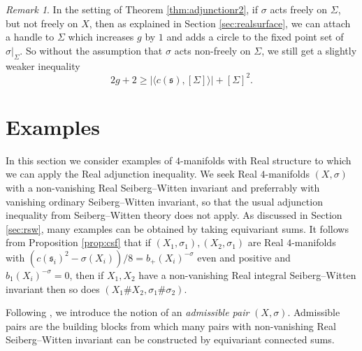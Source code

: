 \documentclass{amsart}
\theoremstyle{definition}
\theoremstyle{remark}
\newtheorem{remark}[theorem]{Remark}
\numberwithin{equation}{section}
\begin{document}
\begin{remark}
In the setting of Theorem \ref{thm:adjunctionr2}, if $\sigma$ acts freely on $\Sigma$, but not freely on $X$, then as explained in Section \ref{sec:realsurface}, we can attach a handle to $\Sigma$ which increases $g$ by $1$ and adds a circle to the fixed point set of $\sigma|_\Sigma$. So without the assumption that $\sigma$ acts non-freely on $\Sigma$, we still get a slightly weaker inequality
\[
2g+2 \ge | \langle c(\mathfrak{s}) , [\Sigma] \rangle | + [\Sigma]^2.
\]
\end{remark}




\section{Examples}\label{sec:ex}

In this section we consider examples of $4$-manifolds with Real structure to which we can apply the Real adjunction inequality. We seek Real $4$-manifolds $(X , \sigma)$ with a non-vanishing Real Seiberg--Witten invariant and preferrably with vanishing ordinary Seiberg--Witten invariant, so that the usual adjunction inequality from Seiberg--Witten theory does not apply. As discussed in Section \ref{sec:rsw}, many examples can be obtained by taking equivariant sums. It follows from Proposition \ref{prop:csf} that if $(X_1 , \sigma_1), (X_2 , \sigma_1)$ are Real $4$-manifolds with $(c(\mathfrak{s}_i)^2 - \sigma(X_i))/8 = b_+(X_i)^{-\sigma}$ even and positive and $b_1(X_i)^{-\sigma} = 0$, then if $X_1,X_2$ have a non-vanishing Real integral Seiberg--Witten invariant then so does $(X_1 \# X_2 , \sigma_1 \# \sigma_2)$.

Following \cite{bar3}, we introduce the notion of an {\em admissible pair} $(X, \sigma)$. Admissible pairs are the building blocks from which many pairs with non-vanishing Real Seiberg--Witten invariant can be constructed by equivariant connected sums.
\end{document}

